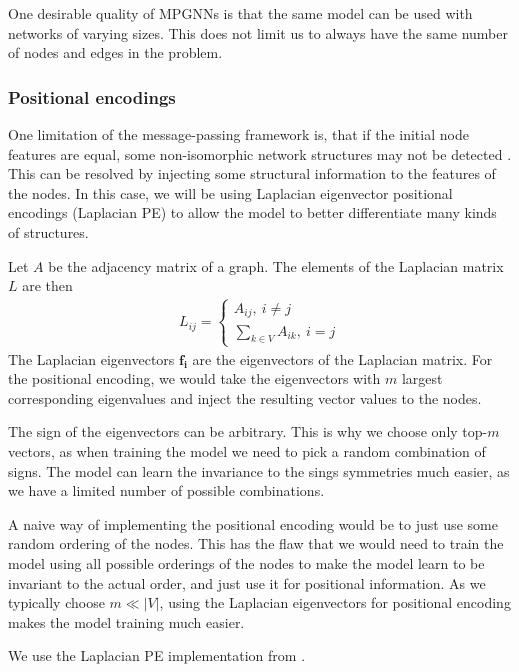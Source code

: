 \documentclass[english, 12pt, a4paper, sci, utf8, a-2b, online]{aaltothesis}
\begin{document}
One desirable quality of MPGNNs is that the same model can be used with networks of varying sizes. This does not limit us to always have the same number of nodes and edges in the problem.



\subsubsection{Positional encodings}

One limitation of the message-passing framework is, that if the initial node features are equal, some non-isomorphic network structures may not be detected \cite{repr-limit-2020}. This can be resolved by injecting some structural information to the features of the nodes. In this case, we will be using Laplacian eigenvector positional encodings (Laplacian PE) \cite{LaPE-first-introduction-2003} to allow the model to better differentiate many kinds of structures.

Let $A$ be the adjacency matrix of a graph. The elements of the Laplacian matrix $L$ are then
\begin{align}
    L_{ij} = \begin{cases}
        A_{ij},\ i \neq j\\
        \sum_{k \in V} A_{ik},\ i = j
    \end{cases}
\end{align}
The Laplacian eigenvectors $\mathbf{f_i}$ are the eigenvectors of the Laplacian matrix. For the positional encoding, we would take the eigenvectors with $m$ largest corresponding eigenvalues and inject the resulting vector values to the nodes.

The sign of the eigenvectors can be arbitrary. This is why we choose only top-$m$ vectors, as when training the model we need to pick a random combination of signs. The model can learn the invariance to the sings symmetries much easier, as we have a limited number of possible combinations.

A naive way of implementing the positional encoding would be to just use some random ordering of the nodes. This has the flaw that we would need to train the model using all possible orderings of the nodes to make the model learn to be invariant to the actual order, and just use it for positional information. As we typically choose $m \ll |V|$, using the Laplacian eigenvectors for positional encoding makes the model training much easier.

We use the Laplacian PE implementation from \cite{LaPE-implementation-2020}.
\end{document}
